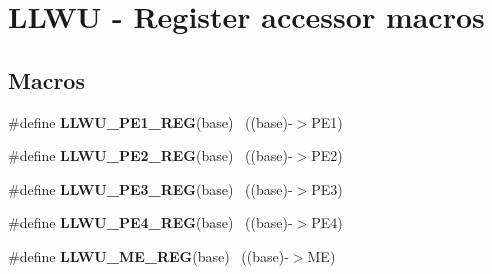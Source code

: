 \hypertarget{group___l_l_w_u___register___accessor___macros}{}\section{L\+L\+W\+U -\/ Register accessor macros}
\label{group___l_l_w_u___register___accessor___macros}
\subsection*{Macros}
\begin{DoxyCompactItemize}
\item 
\hypertarget{group___l_l_w_u___register___accessor___macros_gada86612bb2a3cb6d479429beaca258a8}{}\#define {\bfseries L\+L\+W\+U\+\_\+\+P\+E1\+\_\+\+R\+E\+G}(base)                                          ~((base)-\/$>$P\+E1)\label{group___l_l_w_u___register___accessor___macros_gada86612bb2a3cb6d479429beaca258a8}

\item 
\hypertarget{group___l_l_w_u___register___accessor___macros_ga13e23bebded99c5538c165fec2ffa41f}{}\#define {\bfseries L\+L\+W\+U\+\_\+\+P\+E2\+\_\+\+R\+E\+G}(base)                                          ~((base)-\/$>$P\+E2)\label{group___l_l_w_u___register___accessor___macros_ga13e23bebded99c5538c165fec2ffa41f}

\item 
\hypertarget{group___l_l_w_u___register___accessor___macros_ga0b72bd64b08303c30d4de21aa8bb06b8}{}\#define {\bfseries L\+L\+W\+U\+\_\+\+P\+E3\+\_\+\+R\+E\+G}(base)                                          ~((base)-\/$>$P\+E3)\label{group___l_l_w_u___register___accessor___macros_ga0b72bd64b08303c30d4de21aa8bb06b8}

\item 
\hypertarget{group___l_l_w_u___register___accessor___macros_gaff14d2acccbae996be61c4ba7893024f}{}\#define {\bfseries L\+L\+W\+U\+\_\+\+P\+E4\+\_\+\+R\+E\+G}(base)                                          ~((base)-\/$>$P\+E4)\label{group___l_l_w_u___register___accessor___macros_gaff14d2acccbae996be61c4ba7893024f}

\item 
\hypertarget{group___l_l_w_u___register___accessor___macros_gad2163c47741ae9561ed0cf28003dc06d}{}\#define {\bfseries L\+L\+W\+U\+\_\+\+M\+E\+\_\+\+R\+E\+G}(base)                                            ~((base)-\/$>$M\+E)\label{group___l_l_w_u___register___accessor___macros_gad2163c47741ae9561ed0cf28003dc06d}


\end{DoxyCompactItemize}
